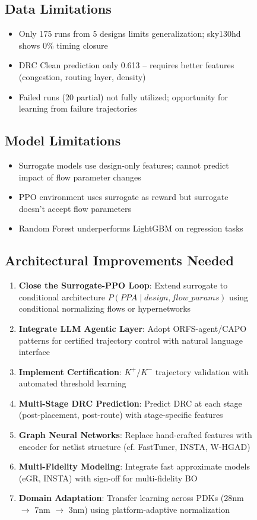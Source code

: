 \documentclass[10pt,conference]{IEEEtran}
\newcommand{\GNN}{\text{GNN}}
\newcommand{\AUC}{\text{AUC}}
\begin{document}
\begin{figure}[t]
\subsection{Data Limitations}
\begin{itemize}
    \item Only 175 runs from 5 designs limits generalization; sky130hd shows 0\% timing closure
    \item DRC Clean prediction \AUC{} only 0.613 -- requires better features (congestion, routing layer, density)
    \item Failed runs (20 partial) not fully utilized; opportunity for learning from failure trajectories
\end{itemize}

\subsection{Model Limitations}
\begin{itemize}
    \item Surrogate models use design-only features; cannot predict impact of flow parameter changes
    \item PPO environment uses surrogate as reward but surrogate doesn't accept flow parameters
    \item Random Forest underperforms LightGBM on regression tasks
\end{itemize}

\subsection{Architectural Improvements Needed}

\begin{enumerate}
    \item \textbf{Close the Surrogate-PPO Loop}: Extend surrogate to conditional architecture $P(PPA \mid design, flow\_params)$ using conditional normalizing flows or hypernetworks
    \item \textbf{Integrate LLM Agentic Layer}: Adopt ORFS-agent/CAPO patterns for certified trajectory control with natural language interface
    \item \textbf{Implement Certification}: $K^+/K^-$ trajectory validation with automated threshold learning
    \item \textbf{Multi-Stage DRC Prediction}: Predict DRC at each stage (post-placement, post-route) with stage-specific features
    \item \textbf{Graph Neural Networks}: Replace hand-crafted features with \GNN{} encoder for netlist structure (cf. FastTuner, INSTA, W-HGAD)
    \item \textbf{Multi-Fidelity Modeling}: Integrate fast approximate models (eGR, INSTA) with sign-off for multi-fidelity BO
    \item \textbf{Domain Adaptation}: Transfer learning across PDKs (28nm $\rightarrow$ 7nm $\rightarrow$ 3nm) using platform-adaptive normalization
\end{enumerate}


\end{figure}
\end{document}
